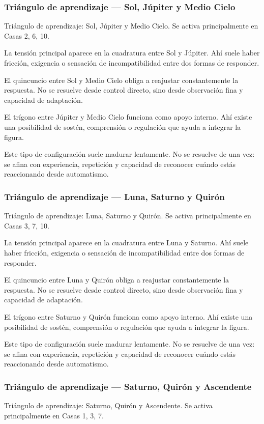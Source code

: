 \documentclass[11pt,a4paper]{article}
\begin{document}
\subsubsection*{Triángulo de aprendizaje — Sol, Júpiter y Medio Cielo}
Triángulo de aprendizaje: Sol, Júpiter y Medio Cielo. Se activa principalmente en Casas 2, 6, 10.

La tensión principal aparece en la cuadratura entre Sol y Júpiter. Ahí suele haber fricción, exigencia o sensación de incompatibilidad entre dos formas de responder.

El quincuncio entre Sol y Medio Cielo obliga a reajustar constantemente la respuesta. No se resuelve desde control directo, sino desde observación fina y capacidad de adaptación.

El trígono entre Júpiter y Medio Cielo funciona como apoyo interno. Ahí existe una posibilidad de sostén, comprensión o regulación que ayuda a integrar la figura.

Este tipo de configuración suele madurar lentamente. No se resuelve de una vez: se afina con experiencia, repetición y capacidad de reconocer cuándo estás reaccionando desde automatismo.

\subsubsection*{Triángulo de aprendizaje — Luna, Saturno y Quirón}
Triángulo de aprendizaje: Luna, Saturno y Quirón. Se activa principalmente en Casas 3, 7, 10.

La tensión principal aparece en la cuadratura entre Luna y Saturno. Ahí suele haber fricción, exigencia o sensación de incompatibilidad entre dos formas de responder.

El quincuncio entre Luna y Quirón obliga a reajustar constantemente la respuesta. No se resuelve desde control directo, sino desde observación fina y capacidad de adaptación.

El trígono entre Saturno y Quirón funciona como apoyo interno. Ahí existe una posibilidad de sostén, comprensión o regulación que ayuda a integrar la figura.

Este tipo de configuración suele madurar lentamente. No se resuelve de una vez: se afina con experiencia, repetición y capacidad de reconocer cuándo estás reaccionando desde automatismo.

\subsubsection*{Triángulo de aprendizaje — Saturno, Quirón y Ascendente}
Triángulo de aprendizaje: Saturno, Quirón y Ascendente. Se activa principalmente en Casas 1, 3, 7.
\end{document}
